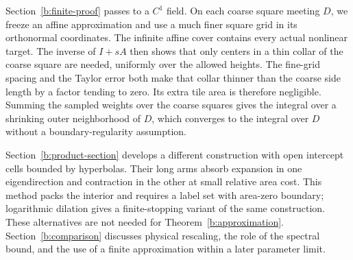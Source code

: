 Section~\ref{b:finite-proof} passes to a $C^1$ field. On each coarse
square meeting $D$, we freeze an affine approximation and use a much
finer square grid in its orthonormal coordinates. The infinite affine
cover contains every actual nonlinear target. The inverse of $I+sA$
then shows that only centers in a thin collar of the coarse square are
needed, uniformly over the allowed heights. The fine-grid spacing and
the Taylor error both make that collar thinner than the coarse side
length by a factor tending to zero. Its extra tile area is therefore
negligible. Summing the sampled weights over the coarse squares gives
the integral over a shrinking outer neighborhood of $D$, which converges
to the integral over $D$ without a boundary-regularity assumption.

Section~\ref{b:product-section} develops a different construction with
open intercept cells bounded by hyperbolas. Their long arms absorb
expansion in one eigendirection and contraction in the other at small
relative area cost. This method packs the interior and requires a label
set with area-zero boundary; logarithmic dilation gives a finite-stopping
variant of the same construction. These alternatives are not needed for
Theorem~\ref{b:approximation}. Section~\ref{b:comparison} discusses
physical rescaling, the role of the spectral bound, and the use of a
finite approximation within a later parameter limit.
